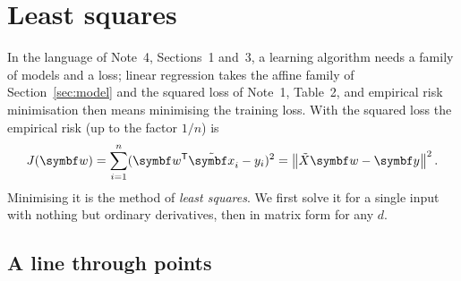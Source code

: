 \documentclass[11pt]{article}
\newcommand{\Xt}{\tilde X}
\newcommand{\xt}{\tilde{\x}}
\newcommand{\w}{\vect{w}}
\newcommand{\y}{\vect{y}}
\begin{document}
\section{Least squares}\label{sec:ls}

In the language of Note~4, Sections~1 and~3, a learning algorithm needs a family of models and a loss; linear
regression takes the affine family of Section~\ref{sec:model} and the squared loss of Note~1, Table~2, and empirical
risk minimisation then means minimising the training loss. With the squared loss the empirical risk (up to the factor
$1/n$) is
\[
  J(\w) = \sum_{i=1}^n (\w\T\xt_i - y_i)^2 = \norm{\Xt\w - \y}^2 .
\]
Minimising it is the method of \emph{least squares}. We first solve it for a single input with nothing but ordinary
derivatives, then in matrix form for any $d$.

\subsection{A line through points}\label{sec:line}
\end{document}
